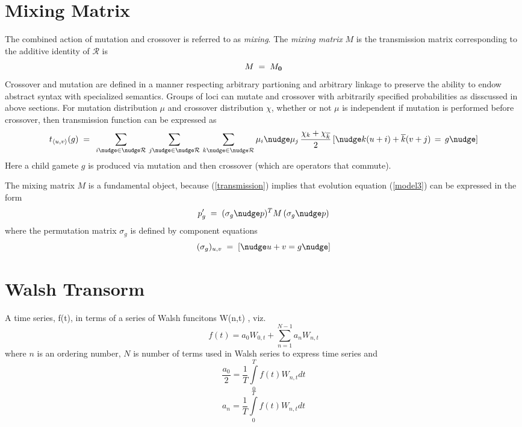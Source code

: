 \section{Mixing Matrix}
The combined action of mutation and crossover is referred to as {\em mixing}.
The {\em mixing matrix\/} $M$ is the transmission matrix corresponding to the 
additive identity of $\mathcal{R}$ is
\[
M \; = \; M_{\bf 0}\\[-0.01in]
\]
Crossover and mutation are defined in a manner respecting arbitrary partioning and arbitrary linkage to preserve the ability to endow abstract syntax with specialized semantics. Groups of loci can mutate and crossover with arbitrarily specified probabilities as disscussed in above sections. For mutation distribution $\mu$ and crossover distribution $\chi$, whether or not $\mu$ is independent if mutation is performed before crossover, then transmission function can be expressed as \cite{VoseWright1998}
\begin{equation}
\label{transmission}
t_{\langle u,v \rangle}(g) \; = \;\,
\sum_{i \nudge \in \nudge \mathcal{R}} \, \sum_{j \nudge \in \nudge \mathcal{R}} \,
\sum_{k \nudge \in \nudge \mathcal{R}}
\mu_i \nudge \mu_j \, \frac{\chi_k + \chi_{\overline{k}}}{2} \,
[\nudge k (u + i) + \overline{k}(v + j) \, = \, g\nudge]
\end{equation}
Here a child gamete $g$ is produced via mutation and then crossover (which are operators that
commute). 

The mixing matrix $M$ is a fundamental object, because (\ref{transmission}) implies that evolution equation (\ref{model3}) can be expressed in the form
\begin{equation}
\label{model4}
p_g^\prime \; = \; (\sigma_g \nudge p)^T M \, (\sigma_g \nudge p)
\end{equation}
where the permutation matrix $\sigma_g$ is defined by component equations
\[
(\sigma_g)_{u,v} \; = \; [\nudge u+v = g\nudge ]
\]

\section{Walsh Transorm}
A time series, f(t), in terms of a series of Walsh funcitons W(n,t) \cite{Beauchamp1975}, viz.
\[
f(t) = a_{0} W_{0,t} + \sum_{n=1}^{N-1} a_n W_{n,t}
\]
where $n$ is an ordering number, $N$ is number of terms used in Walsh series to express time series and
\[
\frac{a_0}{2} = \frac{1}{T} \int\limits_0^T f(t) W_{n,t} dt
\]
\[
a_n = \frac{1}{T} \int\limits_0^T f(t) W_{n,t} dt
\]

